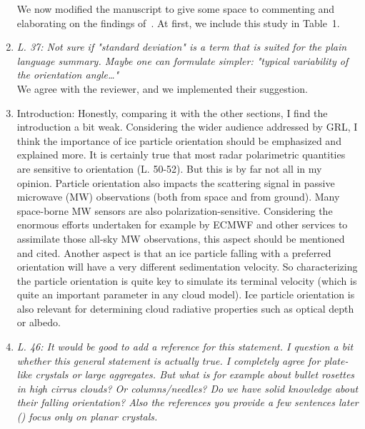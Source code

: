 \documentclass[12pt]{article}
\begin{document}
\begin{enumerate}
    We now modified the manuscript to give some space to commenting and elaborating on the findings of~\cite{Stout_ACP_2024}. At first, we include this study in Table~1. 


    
    
    \item \textit{L. 37: Not sure if "standard deviation" is a term that is suited for the plain language summary. Maybe one can formulate simpler: "typical variability of the orientation angle\dots"}\\

    \noindent
    We agree with the reviewer, and we implemented their suggestion. \\

    \item Introduction: Honestly, comparing it with the other sections, I find the introduction a bit weak. Considering the wider audience addressed by GRL, I think the importance of ice particle orientation should be emphasized and explained more. It is certainly true that most radar polarimetric quantities are sensitive to orientation (L. 50-52). But this is by far not all in my opinion. Particle orientation also impacts the scattering signal in passive microwave (MW) observations (both from space and from ground). Many space-borne MW sensors are also polarization-sensitive. Considering the enormous efforts undertaken for example by ECMWF and other services to assimilate those all-sky MW observations, this aspect should be mentioned and cited. Another aspect is that an ice particle falling with a preferred orientation will have a very different sedimentation velocity. So characterizing the particle orientation is quite key to simulate its terminal velocity (which is quite an important parameter in any cloud model). Ice particle orientation is also relevant for determining cloud radiative properties such as optical depth or albedo.

    \item \textit{L. 46: It would be good to add a reference for this statement. I question a bit whether this general statement is actually true. I completely agree for plate-like crystals or large aggregates. But what is for example about bullet rosettes in high cirrus clouds? Or columns/needles? Do we have solid knowledge about their falling orientation? Also the references you provide a few sentences later (\cite{Noel_JAMC_2005,Tinklenberg_JFM_2023}) focus only on planar crystals.}\\



\end{enumerate}
\end{document}
